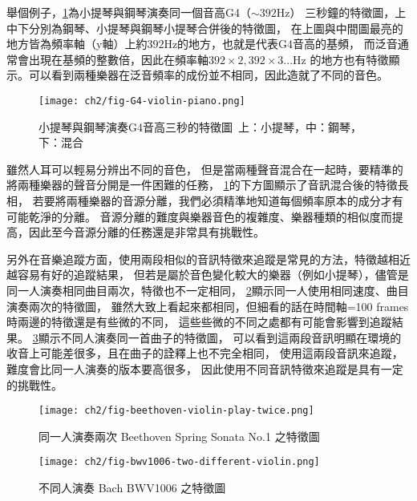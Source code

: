 \documentclass[class=NCU_thesis, crop=false]{standalone}
\begin{document}
舉個例子，\cref{fig:fig-ch2-G4-violin-piano}為小提琴與鋼琴演奏同一個音高G4（$\sim 392$Hz）
三秒鐘的特徵圖，上中下分別為鋼琴、小提琴與鋼琴小提琴合併後的特徵圖，
在上圖與中間圖最亮的地方皆為頻率軸（y軸）上約$392$Hz的地方，也就是代表G4音高的基頻，
而泛音通常會出現在基頻的整數倍，因此在頻率軸$392\times 2, 392\times 3 ...$Hz
的地方也有特徵顯示。可以看到兩種樂器在泛音頻率的成份並不相同，因此造就了不同的音色。

\begin{figure}[H]
    \centering
    \texttt{[image: ch2/fig-G4-violin-piano.png]}
    \caption{小提琴與鋼琴演奏G4音高三秒的特徵圖\ 上：小提琴，中：鋼琴，下：混合}
    \label{fig:fig-ch2-G4-violin-piano}
\end{figure}

雖然人耳可以輕易分辨出不同的音色，
但是當兩種聲音混合在一起時，要精準的將兩種樂器的聲音分開是一件困難的任務，
\cref{fig:fig-ch2-G4-violin-piano}的下方圖顯示了音訊混合後的特徵長相，
若要將兩種樂器的音源分離，我們必須精準地知道每個頻率原本的成分才有可能乾淨的分離。
音源分離的難度與樂器音色的複雜度、樂器種類的相似度而提高，因此至今音源分離的任務還是非常具有挑戰性。

另外在音樂追蹤方面，使用兩段相似的音訊特徵來追蹤是常見的方法，特徵越相近越容易有好的追蹤結果，
但若是屬於音色變化較大的樂器（例如小提琴），儘管是同一人演奏相同曲目兩次，特徵也不一定相同，
\cref{fig:fig-ch2-beethoven-violin-play-twice}顯示同一人使用相同速度、曲目演奏兩次的特徵圖，
雖然大致上看起來都相同，但細看的話在時間軸=100 frames時兩邊的特徵還是有些微的不同，
這些些微的不同之處都有可能會影響到追蹤結果。
\cref{fig:fig-ch2-bwv1006-two-different-violin}顯示不同人演奏同一首曲子的特徵圖，
可以看到這兩段音訊明顯在環境的收音上可能差很多，且在曲子的詮釋上也不完全相同，
使用這兩段音訊來追蹤，難度會比同一人演奏的版本要高很多，
因此使用不同音訊特徵來追蹤是具有一定的挑戰性。

\begin{figure}[H]
    \centering
    \texttt{[image: ch2/fig-beethoven-violin-play-twice.png]}
    \caption{同一人演奏兩次 Beethoven Spring Sonata No.1 之特徵圖}
    \label{fig:fig-ch2-beethoven-violin-play-twice}
\end{figure}

\begin{figure}[H]
    \centering
    \texttt{[image: ch2/fig-bwv1006-two-different-violin.png]}
    \caption{不同人演奏 Bach BWV1006 之特徵圖}
    \label{fig:fig-ch2-bwv1006-two-different-violin}
\end{figure}
\end{document}

